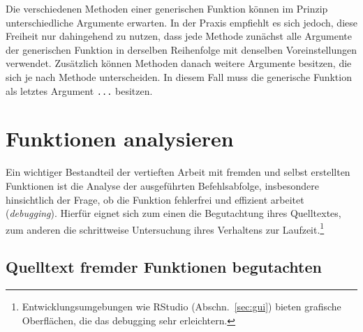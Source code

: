Die verschiedenen Methoden einer generischen Funktion können im Prinzip unterschiedliche Argumente erwarten. In der Praxis empfiehlt es sich jedoch, diese Freiheit nur dahingehend zu nutzen, dass jede Methode zunächst alle Argumente der generischen Funktion in derselben Reihenfolge mit denselben Voreinstellungen verwendet. Zusätzlich können Methoden danach weitere Argumente besitzen, die sich je nach Methode unterscheiden. In diesem Fall muss die generische Funktion als letztes Argument \lstinline!...! besitzen.

\section{Funktionen analysieren}
\label{sec:debug}

Ein wichtiger Bestandteil der vertieften Arbeit mit fremden und selbst erstellten Funktionen ist die Analyse der ausgeführten Befehlsabfolge, insbesondere hinsichtlich der Frage, ob die Funktion fehlerfrei und effizient arbeitet (\emph{debugging}). Hierfür eignet sich zum einen die Begutachtung ihres Quelltextes, zum anderen die schrittweise Untersuchung ihres Verhaltens zur Laufzeit.\footnote{Entwicklungsumgebungen wie RStudio (Abschn.\ \ref{sec:gui}) bieten grafische Oberflächen, die das debugging sehr erleichtern.}

\subsection{Quelltext fremder Funktionen begutachten}
\label{sec:debugForeign}

